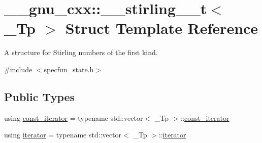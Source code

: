 \hypertarget{struct____gnu__cxx_1_1____stirling__2__t}{}\section{\+\_\+\+\_\+gnu\+\_\+cxx\+:\+:\+\_\+\+\_\+stirling\+\_\+\_\+t$<$ \+\_\+\+Tp $>$ Struct Template Reference}
\label{struct____gnu__cxx_1_1____stirling__2__t}


A structure for Stirling numbers of the first kind.  




{\ttfamily \#include $<$specfun\+\_\+state.\+h$>$}

\subsection*{Public Types}
\begin{DoxyCompactItemize}
\item 
using \hyperlink{struct____gnu__cxx_1_1____stirling__2__t_a1de3af89467d37bd2d1f1228186c08e8}{const\+\_\+iterator} = typename std\+::vector$<$ \+\_\+\+Tp $>$\+::\hyperlink{struct____gnu__cxx_1_1____stirling__2__t_a1de3af89467d37bd2d1f1228186c08e8}{const\+\_\+iterator}
\item 
using \hyperlink{struct____gnu__cxx_1_1____stirling__2__t_aa7fda155fac4d993df6fc7deb4a66e84}{iterator} = typename std\+::vector$<$ \+\_\+\+Tp $>$\+::\hyperlink{struct____gnu__cxx_1_1____stirling__2__t_aa7fda155fac4d993df6fc7deb4a66e84}{iterator}
\end{DoxyCompactItemize}

